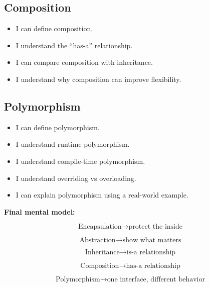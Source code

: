 \documentclass[11pt,a4paper]{article}
\newcommand{\checkitem}{$\square$}
\begin{document}
\subsection*{Composition}

\begin{itemize}[label=\checkitem]
    \item I can define composition.
    \item I understand the ``has-a'' relationship.
    \item I can compare composition with inheritance.
    \item I understand why composition can improve flexibility.
\end{itemize}

\subsection*{Polymorphism}

\begin{itemize}[label=\checkitem]
    \item I can define polymorphism.
    \item I understand runtime polymorphism.
    \item I understand compile-time polymorphism.
    \item I understand overriding vs overloading.
    \item I can explain polymorphism using a real-world example.
\end{itemize}

\begin{conceptbox}
\textbf{Final mental model:}

\[
\boxed{
\text{Encapsulation}
\rightarrow
\text{protect the inside}
}
\]

\[
\boxed{
\text{Abstraction}
\rightarrow
\text{show what matters}
}
\]

\[
\boxed{
\text{Inheritance}
\rightarrow
\text{is-a relationship}
}
\]

\[
\boxed{
\text{Composition}
\rightarrow
\text{has-a relationship}
}
\]

\[
\boxed{
\text{Polymorphism}
\rightarrow
\text{one interface, different behavior}
}
\]
\end{conceptbox}
\end{document}
